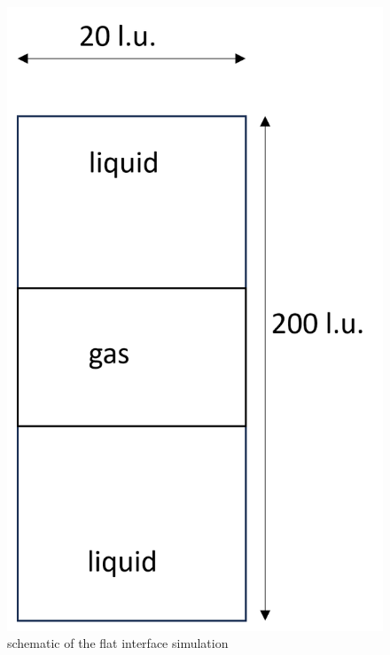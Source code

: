 \documentclass[review]{elsarticle}
\begin{document}
\begin{figure}[htp]
	\centering
	\includegraphics[scale=0.6]{flat-interface}
	\caption{schematic of the flat interface simulation}
	\label{fig:schematics-flat}
\end{figure}
\end{document}
